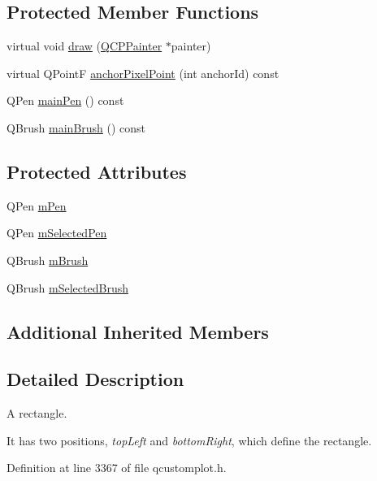 \subsection*{Protected Member Functions}
\begin{DoxyCompactItemize}
\item 
virtual void \hyperlink{class_q_c_p_item_rect_a18cd583638b876cdd50f1a155ec182aa}{draw} (\hyperlink{class_q_c_p_painter}{Q\+C\+P\+Painter} $\ast$painter)
\item 
virtual Q\+Point\+F \hyperlink{class_q_c_p_item_rect_ae0973f8281fb52361b0c99ee899be07e}{anchor\+Pixel\+Point} (int anchor\+Id) const 
\item 
Q\+Pen \hyperlink{class_q_c_p_item_rect_afa0fb7c6328a1e197ecd537de36daf8f}{main\+Pen} () const 
\item 
Q\+Brush \hyperlink{class_q_c_p_item_rect_ab0bd8e272e822ec851ba5b0c20e9200e}{main\+Brush} () const 
\end{DoxyCompactItemize}
\subsection*{Protected Attributes}
\begin{DoxyCompactItemize}
\item 
Q\+Pen \hyperlink{class_q_c_p_item_rect_aa0d49323628d6752026056bfb52afd86}{m\+Pen}
\item 
Q\+Pen \hyperlink{class_q_c_p_item_rect_a73cc0bee61de3c67221ec8c7a76a29ed}{m\+Selected\+Pen}
\item 
Q\+Brush \hyperlink{class_q_c_p_item_rect_a2d7f207fada27588b3a52b19234d3c2e}{m\+Brush}
\item 
Q\+Brush \hyperlink{class_q_c_p_item_rect_a21b70eee59b6e19ae0bbdf037b13508f}{m\+Selected\+Brush}
\end{DoxyCompactItemize}
\subsection*{Additional Inherited Members}


\subsection{Detailed Description}
A rectangle. 

 It has two positions, {\itshape top\+Left} and {\itshape bottom\+Right}, which define the rectangle. 

Definition at line 3367 of file qcustomplot.\+h.



